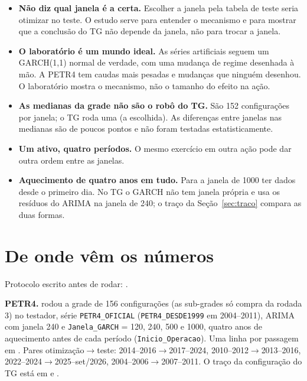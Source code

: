 \documentclass[11pt,a4paper]{article}
\begin{document}
\begin{cuidado}
\begin{itemize}\setlength\itemsep{2pt}
\item \textbf{Não diz qual janela é a certa.} Escolher a janela pela tabela de teste seria otimizar no teste. O
estudo serve para entender o mecanismo e para mostrar que a conclusão do TG não depende da janela, não para trocar
a janela.
\item \textbf{O laboratório é um mundo ideal.} As séries artificiais seguem um GARCH(1,1) normal de verdade, com uma
mudança de regime desenhada à mão. A PETR4 tem caudas mais pesadas e mudanças que ninguém desenhou. O laboratório
mostra o mecanismo, não o tamanho do efeito na ação.
\item \textbf{As medianas da grade não são o robô do TG.} São 152 configurações por janela; o TG roda uma
(a escolhida). As diferenças entre janelas nas medianas são de poucos pontos e não foram testadas
estatisticamente.
\item \textbf{Um ativo, quatro períodos.} O mesmo exercício em outra ação pode dar outra ordem entre as janelas.
\item \textbf{Aquecimento de quatro anos em tudo.} Para a janela de 1000 ter dados desde o primeiro dia. No TG o
GARCH não tem janela própria e usa os resíduos do ARIMA na janela de 240; o traço da Seção~\ref{sec:traco} compara
as duas formas.
\end{itemize}
\end{cuidado}

\section*{De onde vêm os números}
\small\sloppy
Protocolo escrito antes de rodar: .

\textbf{PETR4.}  rodou a grade de 156 configurações (as sub-grades
só compra da rodada 3) no testador, série \texttt{PETR4\_OFICIAL} (\texttt{PETR4\_DESDE1999} em 2004--2011), ARIMA
com janela 240 e \texttt{Janela\_GARCH} = 120, 240, 500 e 1000, quatro anos de aquecimento antes de cada período
(\texttt{Inicio\_Operacao}). Uma linha por passagem em . Pares
otimização$\to$teste: 2014--2016$\to$2017--2024, 2010--2012$\to$2013--2016, 2022--2024$\to$2025--set/2026,
2004--2006$\to$2007--2011. O traço da configuração do TG está em  e .
\end{document}
